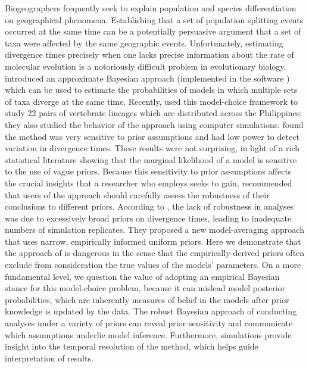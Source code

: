 Biogeographers frequently seek to explain population and species
differentiation on geographical phenomena.
Establishing that a set of population splitting events occurred
at the same time can be a potentially persuasive argument that a set of taxa
were affected by the same geographic events.
Unfortunately, estimating divergence times precisely when one lacks
precise information about the rate of molecular evolution is a notoriously
difficult problem in evolutionary biology.
\citet{Huang2011} introduced an approximate Bayesian approach (implemented
in the software \msb) which can be used to estimate the probabilities of
models in which multiple sets of taxa diverge at the same time. 
Recently, \citet{Oaks2012} used this model-choice framework to 
study 22 pairs of vertebrate lineages which are distributed across
the Philippines; they also studied the behavior of the \msb approach
using computer simulations.
\citet{Oaks2012} found the method was very sensitive to prior assumptions and
had low power to detect variation in divergence times.
These results were not surprising, in light of a rich statistical literature
showing that the marginal likelihood of a model is sensitive to the
use of vague priors.
Because this sensitivity to prior assumptions affects the crucial insights 
that a researcher who employs \msb seeks to gain, \citet{Oaks2012} recommended
that users of the approach should carefully assess the robustness of their 
conclusions to different priors.
According to \citet{Hickerson2013}, the lack of robustness in \msb analyses
was due to excessively broad priors on divergence times, leading to 
inadequate numbers of simulation replicates.
They proposed a new model-averaging approach that uses narrow, empirically
informed uniform priors.
Here we demonstrate that the approach of \citet{Hickerson2013} is
dangerous in the sense that the empirically-derived priors often
exclude from consideration the true values of the models' parameters.
On a more fundamental level, we question the value of adopting an empirical
Bayesian stance for this model-choice problem, because it can mislead model
posterior probabilities, which are inherently measures of belief in the
models after prior knowledge is updated by the data.
The robust Bayesian approach of conducting analyses under a variety
of priors can reveal prior sensitivity and communicate which assumptions
underlie model inference.
Furthermore, simulations provide insight into the temporal resolution of the
method, which helps guide interpretation of results.
